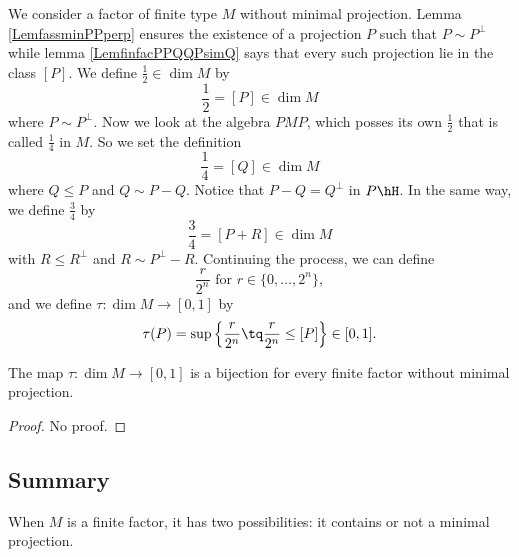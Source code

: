 We consider a factor of finite type $M$ without minimal projection. Lemma \ref{LemfassminPPperp} ensures the existence of a projection $P$ such that $P\sim P^{\perp}$ while lemma \ref{LemfinfacPPQQPsimQ} says that every such projection lie in the class $[P]$. We define $\frac{ 1 }{2}\in\dim M$ by
\begin{equation}
\frac{ 1 }{2}=[P]\in\dim M
\end{equation}
where $P\sim P^{\perp}$. Now we look at the algebra $PMP$, which posses its own $\frac{ 1 }{2}$ that is called $\frac{1}{ 4 }$ in $M$. So we set the definition
\begin{equation}
	\frac{1}{ 4 }=[Q]\in\dim M
\end{equation}
where $Q\leq P$ and $Q\sim P-Q$. Notice that $P-Q=Q^{\perp}$ in $P\hH$. In the same way, we define $\frac{ 3 }{ 4 }$ by
\begin{equation}
	\frac{ 3 }{ 4 }=[P+R]\in\dim M
\end{equation}
with $R\leq R^{\perp}$ and $R\sim P^{\perp}-R$. Continuing the process, we can define
\[ 
	\frac{ r }{ 2^n }\text{ for } r\in\{ 0,\ldots, 2^n \},
\]
and we define $\tau\colon \dim M\to [0,1]$ by
\begin{equation}
	\tau(P)=\sup\Big\{ \frac{ r }{ 2^n }\tq \frac{ r }{ 2^n }\leq [P] \Big\}\in [0,1].
\end{equation}

\begin{theorem}		\label{ThobijzudimM}
The map $\tau\colon \dim M\to [0,1]$ is a bijection for every finite factor without minimal projection.
\end{theorem}

\begin{proof}
No proof.
\end{proof}

					\subsection{Summary}

When $M$ is a finite factor, it has two possibilities: it contains or not a minimal projection.

